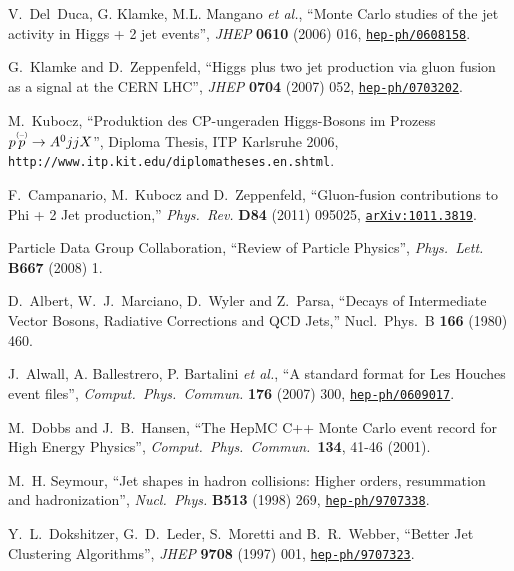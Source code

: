 \documentclass[english,12pt]{article}
\begin{document}
\begin{thebibliography}{10}
V.~Del~Duca, G. Klamke, M.L. Mangano {\it et al.}, ``{Monte Carlo studies of the jet activity in Higgs +
  2 jet events}'', {\em JHEP} {\bf 0610} (2006) 016,
\href{http://www.arXiv.org/abs/hep-ph/0608158}{{\tt hep-ph/0608158}}.

G.~Klamke and D.~Zeppenfeld, ``{Higgs plus two jet production via gluon fusion
  as a signal at the CERN LHC}'', {\em JHEP} {\bf 0704} (2007) 052,
\href{http://www.arXiv.org/abs/hep-ph/0703202}{{\tt hep-ph/0703202}}.

M.~Kubocz, ``Produktion des CP-ungeraden Higgs-Bosons im Prozess $p \overset{\mbox{\tiny{(--)}}}{p} \to
  A^{0}jjX$'', {Diploma Thesis, ITP Karlsruhe 2006}, {{\tt http://www.itp.kit.edu/diplomatheses.en.shtml}}.

  F.~Campanario, M.~Kubocz and D.~Zeppenfeld,
  ``Gluon-fusion contributions to Phi + 2 Jet production,''
  {\em Phys.\ Rev.} {\bf D84} (2011) 095025,
  \href{http://www.arXiv.org/abs/1011.3819}{{\tt arXiv:1011.3819}}.

{Particle Data Group} Collaboration, ``{Review of
  Particle Physics}'', {\em Phys.\ Lett.} {\bf B667} (2008) 1.

  D.~Albert, W.~J.~Marciano, D.~Wyler and Z.~Parsa,
  ``Decays of Intermediate Vector Bosons, Radiative Corrections and QCD Jets,''
  Nucl.\ Phys.\ B {\bf 166} (1980) 460.

J.~Alwall, A. Ballestrero, P. Bartalini {\em et al.}, ``A standard format for Les Houches event files'', {\em
  Comput.\ Phys.\ Commun.} {\bf 176} (2007) 300,
\href{http://www.arXiv.org/abs/hep-ph/0609017}{{\tt hep-ph/0609017}}.

  M.~Dobbs and J.~B.~Hansen,
  ``The HepMC C++ Monte Carlo event record for High Energy Physics'',
  {\em Comput.\ Phys.\ Commun.\  }{\bf 134}, 41-46 (2001).

M.~H. Seymour, ``{Jet shapes in hadron collisions: Higher orders, resummation
  and hadronization}'', {\em Nucl.\ Phys.} {\bf B513} (1998) 269,
\href{http://www.arXiv.org/abs/hep-ph/9707338}{{\tt hep-ph/9707338}}.

  Y.~L.~Dokshitzer, G.~D.~Leder, S.~Moretti and B.~R.~Webber,
  ``Better Jet Clustering Algorithms'',
  {\em JHEP} {\bf 9708} (1997) 001,
  \href{http://arxiv.org/abs/hep-ph/9707323}{{\tt hep-ph/9707323}}.


\end{thebibliography}
\end{document}
